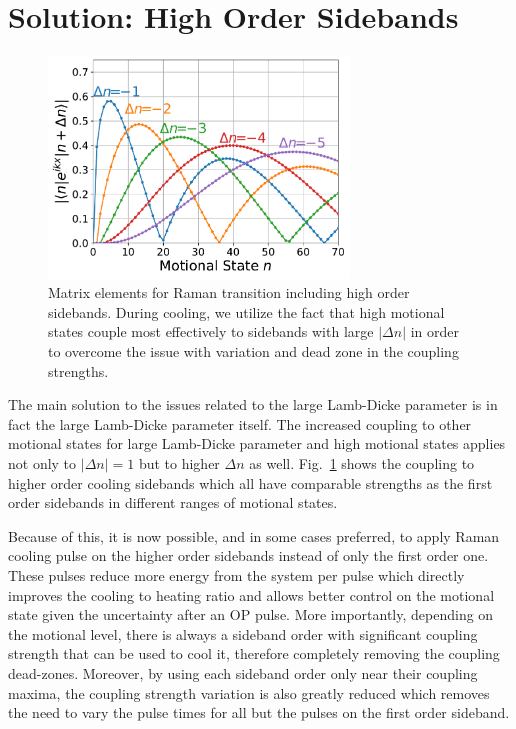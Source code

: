 \section{Solution: High Order Sidebands}
\label{ch:rsc:solution-high-orders}

\begin{figure}
  \centering
  \includegraphics[width=8cm]{figures/na_rsc_mele_raman.pdf}
  \caption[Raman coupling including high order sidebands]{
    Matrix elements for Raman transition including high order sidebands.
    During cooling, we utilize the fact that high motional states couple most effectively
    to sidebands with large $|\Delta n|$ in order to overcome the issue with
    variation and dead zone in the coupling strengths.
    \label{fig:rsc:na-mele-raman}}
\end{figure}

The main solution to the issues related to the large Lamb-Dicke parameter
is in fact the large Lamb-Dicke parameter itself.
The increased coupling to other motional states for large Lamb-Dicke parameter
and high motional states applies not only to $|\Delta n|=1$ but to higher $\Delta n$ as well.
Fig.~\ref{fig:rsc:na-mele-raman} shows the coupling to higher order cooling sidebands
which all have comparable strengths as the first order sidebands in different ranges
of motional states.

Because of this, it is now possible, and in some cases preferred, to apply Raman cooling pulse
on the higher order sidebands instead of only the first order one.
These pulses reduce more energy from the system per pulse which directly improves
the cooling to heating ratio and allows better control on the motional state
given the uncertainty after an OP pulse.
More importantly, depending on the motional level, there is always a sideband order
with significant coupling strength that can be used to cool it,
therefore completely removing the coupling dead-zones.
Moreover, by using each sideband order only near their coupling maxima,
the coupling strength variation is also greatly reduced which removes
the need to vary the pulse times for all but the pulses on the first order sideband.

